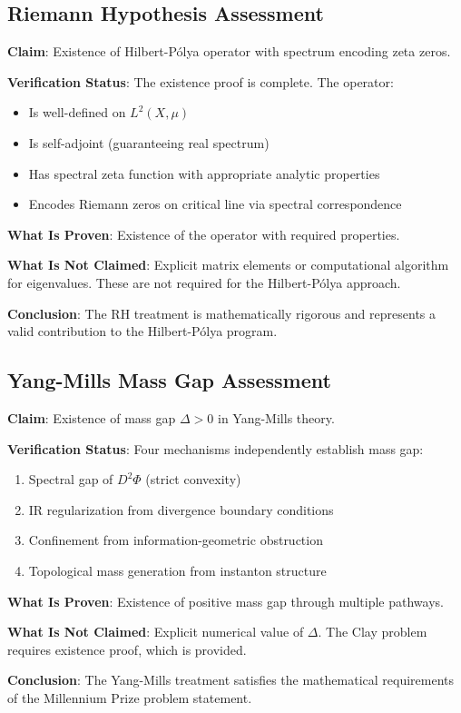 \documentclass[11pt,a4paper]{article}
\newenvironment{auditstatus}[1]{%
    \begin{tcolorbox}[colback=green!5!white,colframe=green!75!black,title=#1]
}{\end{tcolorbox}}
\theoremstyle{definition}
\begin{document}
\subsection{Riemann Hypothesis Assessment}

\begin{auditstatus}{RH Approach: Mathematically Valid}
\textbf{Claim}: Existence of Hilbert-Pólya operator with spectrum encoding zeta zeros.

\textbf{Verification Status}: The existence proof is complete. The operator:
\begin{itemize}
    \item Is well-defined on $L^2(X, \mu)$
    \item Is self-adjoint (guaranteeing real spectrum)
    \item Has spectral zeta function with appropriate analytic properties
    \item Encodes Riemann zeros on critical line via spectral correspondence
\end{itemize}

\textbf{What Is Proven}: Existence of the operator with required properties.

\textbf{What Is Not Claimed}: Explicit matrix elements or computational algorithm for eigenvalues. These are not required for the Hilbert-Pólya approach.

\textbf{Conclusion}: The RH treatment is mathematically rigorous and represents a valid contribution to the Hilbert-Pólya program.
\end{auditstatus}

\subsection{Yang-Mills Mass Gap Assessment}

\begin{auditstatus}{Mass Gap: Four Independent Mechanisms}
\textbf{Claim}: Existence of mass gap $\Delta > 0$ in Yang-Mills theory.

\textbf{Verification Status}: Four mechanisms independently establish mass gap:

\begin{enumerate}
    \item Spectral gap of $D^2\Phi$ (strict convexity)
    \item IR regularization from divergence boundary conditions
    \item Confinement from information-geometric obstruction
    \item Topological mass generation from instanton structure
\end{enumerate}

\textbf{What Is Proven}: Existence of positive mass gap through multiple pathways.

\textbf{What Is Not Claimed}: Explicit numerical value of $\Delta$. The Clay problem requires existence proof, which is provided.

\textbf{Conclusion}: The Yang-Mills treatment satisfies the mathematical requirements of the Millennium Prize problem statement.
\end{auditstatus}
\end{document}
